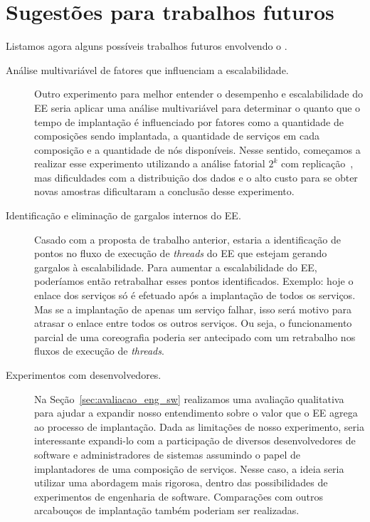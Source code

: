 \section{Sugestões para trabalhos futuros}

Listamos agora alguns possíveis trabalhos futuros envolvendo o \ee.

\begin{description}

\item[Análise multivariável de fatores que influenciam a escalabilidade.] 
Outro experimento para melhor entender o desempenho e escalabilidade do EE
seria aplicar uma análise multivariável para determinar o quanto
que o tempo de implantação é influenciado por fatores como a quantidade de composições
sendo implantada, a quantidade de serviços em cada composição e a quantidade
de nós disponíveis.
Nesse sentido, começamos a realizar esse experimento utilizando a análise fatorial $2^k$
com replicação~\cite{Jain20002kr}, mas dificuldades com a distribuição dos dados e o alto custo
para se obter novas amostras dificultaram a conclusão desse experimento.

\item[Identificação e eliminação de gargalos internos do EE.]
Casado com a proposta de trabalho anterior,
estaria a identificação de pontos no fluxo de execução de \emph{threads} do EE
que estejam gerando gargalos à escalabilidade.
Para aumentar a escalabilidade do EE, poderíamos então retrabalhar 
esses pontos identificados. Exemplo: hoje o enlace dos serviços
só é efetuado após a implantação de todos os serviços.
Mas se a implantação de apenas um serviço falhar, isso será motivo para atrasar o 
enlace entre todos os outros serviços. Ou seja, o funcionamento parcial
de uma coreografia poderia ser antecipado com um retrabalho nos fluxos
de execução de \emph{threads}.

\item[Experimentos com desenvolvedores.] 
Na Seção~\ref{sec:avaliacao_eng_sw} realizamos uma avaliação qualitativa para
ajudar a expandir nosso entendimento sobre o valor que o EE agrega ao processo de implantação.
Dada as limitações de nosso experimento, seria interessante expandi-lo
com a participação de diversos desenvolvedores de software
e administradores de sistemas assumindo o papel de implantadores de uma composição de serviços.
Nesse caso, a ideia seria utilizar uma abordagem mais rigorosa,
dentro das possibilidades de experimentos de engenharia de software.
Comparações com outros arcabouços de implantação também poderiam ser realizadas.


\end{description}

